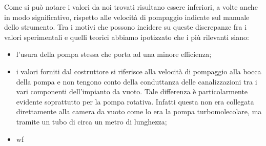 Come si può notare i valori da noi trovati risultano essere inferiori, a volte anche in modo significativo, rispetto alle velocità di pompaggio indicate sul manuale dello strumento.
Tra i motivi che possono incidere su queste discrepanze fra i valori sperimentali e quelli teorici abbiamo ipotizzato che i più rilevanti siano:

\begin{itemize}
	\item{l'usura della pompa stessa che porta ad una minore efficienza;}
	\item{i valori forniti dal costruttore si riferisce alla velocità di pompaggio alla bocca della pompa e non tengono conto della conduttanza delle canalizzazioni tra i vari componenti dell'impianto da vuoto. Tale differenza è particolarmente evidente soprattutto per la pompa rotativa. Infatti questa non era collegata direttamente alla camera da vuoto come lo era la pompa turbomolecolare, ma tramite un tubo di circa un metro di lunghezza;}%
	\item{wf}
\end{itemize}


